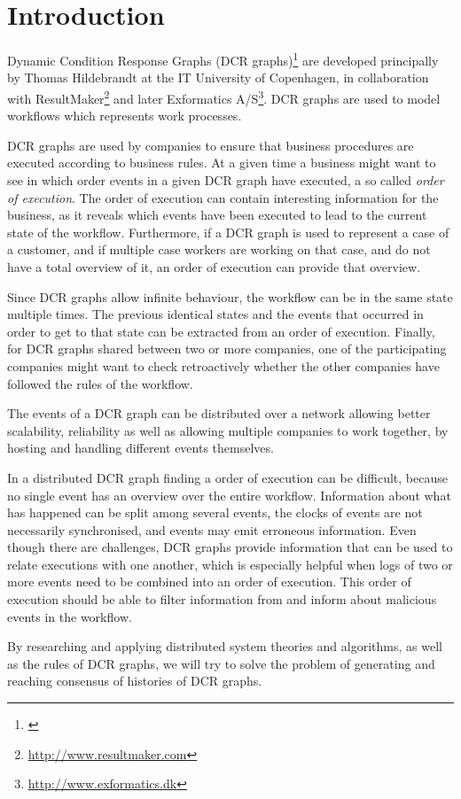 \chapter{Introduction}
	Dynamic Condition Response Graphs (DCR graphs)\footnote{\cite{hildebrandt2011declarative}} are developed principally by Thomas Hildebrandt at the IT University of Copenhagen, in collaboration with ResultMaker\footnote{\url{http://www.resultmaker.com}} and later Exformatics A/S\footnote{\url{http://www.exformatics.dk}}. DCR graphs are used to model workflows which represents work processes.
	
	\newpar DCR graphs are used by companies to ensure that business procedures are executed according to business rules. At a given time a business might want to see in which order events in a given DCR graph have executed, a so called \textit{order of execution}. The order of execution can contain interesting information for the business, as it reveals which events have been executed to lead to the current state of the workflow. Furthermore, if a DCR graph is used to represent a case of a customer, and if multiple case workers are working on that case, and do not have a total overview of it, an order of execution can provide that overview. 
	
	Since DCR graphs allow infinite behaviour, the workflow can be in the same state multiple times. The previous identical states and the events that occurred in order to get to that state can be extracted from an order of execution. Finally, for DCR graphs shared between two or more companies, one of the participating companies might want to check retroactively whether the other companies have followed the rules of the workflow.
	
	\newpar The events of a DCR graph can be distributed over a network allowing better scalability, reliability as well as allowing multiple companies to work together, by hosting and handling different events themselves.
	
	\newpar In a distributed DCR graph finding a order of execution can be difficult, because no single event has an overview over the entire workflow. Information about what has happened can be split among several events, the clocks of events are not necessarily synchronised, and events may emit erroneous information. Even though there are challenges, DCR graphs provide information that can be used to relate executions with one another, which is especially helpful when logs of two or more events need to be combined into an order of execution. This order of execution should be able to filter information from and inform about malicious events in the workflow.

	\newpar By researching and applying distributed system theories and algorithms, as well as the rules of DCR graphs, we will try to solve the problem of generating and reaching consensus of histories of DCR graphs.